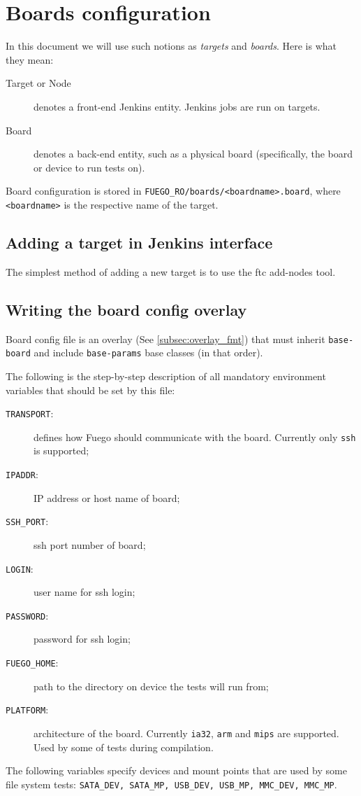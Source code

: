\section{Boards configuration}
In this document we will use such notions as \textit{targets} and \textit{boards}. Here is what they mean:
\begin{description}
\item[Target or Node] denotes a front-end Jenkins entity. Jenkins jobs are run on targets.
\item[Board] denotes a back-end entity, such as a physical board (specifically, the board or device to run tests on).
\end{description}

Board configuration is stored in \texttt{FUEGO\_RO/boards/<boardname>.board},
where \texttt{<boardname>} is the respective name of the target.

\subsection{Adding a target in Jenkins interface}
\label{sec:target-add}
The simplest method of adding a new target is to use the ftc add-nodes tool.

\subsection{Writing the board config overlay}
\label{sec:board_config}
Board config file is an overlay (See \ref{subsec:overlay_fmt}) that must inherit \texttt{base-board} and include \texttt{base-params} base classes (in that order).

The following is the step-by-step description of all mandatory environment variables that should be set by this file:

\begin{description}
\item[\texttt{TRANSPORT}:] defines how Fuego should communicate with the board.
  Currently only \texttt{ssh} is supported;
\item[\texttt{IPADDR}:]  IP address or host name of board;
\item[\texttt{SSH\_PORT}:]  ssh port number of board;
\item[\texttt{LOGIN}:]  user name for ssh login;
\item[\texttt{PASSWORD}:] password for ssh login;
\item[\texttt{FUEGO\_HOME}:] path to the directory on device the tests will run from;
\item[\texttt{PLATFORM}:] architecture of the board.
  Currently \texttt{ia32}, \texttt{arm} and \texttt{mips} are supported. Used by some of tests during compilation.
\end{description}

The following variables specify devices and mount points that are used by some
file system tests: \texttt{SATA\_DEV, SATA\_MP, USB\_DEV, USB\_MP, MMC\_DEV, MMC\_MP}.




